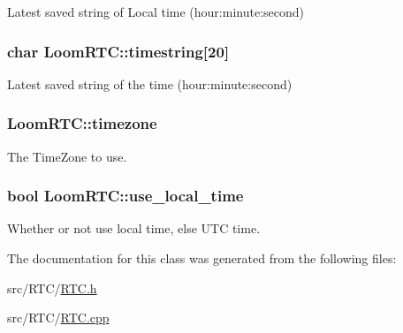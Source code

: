 Latest saved string of Local time (hour\+:minute\+:second) 

\subsubsection[{\texorpdfstring{timestring}{timestring}}]{\setlength{\rightskip}{0pt plus 5cm}char Loom\+R\+T\+C\+::timestring\mbox{[}20\mbox{]}\hspace{0.3cm}{\ttfamily [protected]}}\hypertarget{class_loom_r_t_c_a30e77eaeb4b0e25c8fde9239e64fe13a}{}\label{class_loom_r_t_c_a30e77eaeb4b0e25c8fde9239e64fe13a}


Latest saved string of the time (hour\+:minute\+:second) 

\subsubsection[{\texorpdfstring{timezone}{timezone}}]{ Loom\+R\+T\+C\+::timezone\hspace{0.3cm}{\ttfamily [protected]}}\hypertarget{class_loom_r_t_c_a6c1336bf000fd9a385f315d43bbbc5b0}{}\label{class_loom_r_t_c_a6c1336bf000fd9a385f315d43bbbc5b0}


The Time\+Zone to use. 

\subsubsection[{\texorpdfstring{use\+\_\+local\+\_\+time}{use_local_time}}]{\setlength{\rightskip}{0pt plus 5cm}bool Loom\+R\+T\+C\+::use\+\_\+local\+\_\+time\hspace{0.3cm}{\ttfamily [protected]}}\hypertarget{class_loom_r_t_c_a5783620e9af8eb5fa0818aa189483d8e}{}\label{class_loom_r_t_c_a5783620e9af8eb5fa0818aa189483d8e}


Whether or not use local time, else U\+TC time. 



The documentation for this class was generated from the following files\+:\begin{DoxyCompactItemize}
\item 
src/\+R\+T\+C/\hyperlink{_r_t_c_8h}{R\+T\+C.\+h}\item 
src/\+R\+T\+C/\hyperlink{_r_t_c_8cpp}{R\+T\+C.\+cpp}\end{DoxyCompactItemize}
